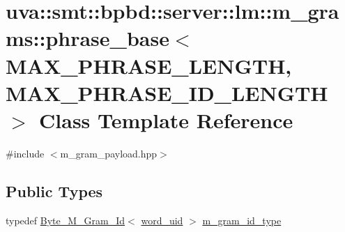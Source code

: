 \hypertarget{classuva_1_1smt_1_1bpbd_1_1server_1_1lm_1_1m__grams_1_1phrase__base}{}\section{uva\+:\+:smt\+:\+:bpbd\+:\+:server\+:\+:lm\+:\+:m\+\_\+grams\+:\+:phrase\+\_\+base$<$ M\+A\+X\+\_\+\+P\+H\+R\+A\+S\+E\+\_\+\+L\+E\+N\+G\+T\+H, M\+A\+X\+\_\+\+P\+H\+R\+A\+S\+E\+\_\+\+I\+D\+\_\+\+L\+E\+N\+G\+T\+H $>$ Class Template Reference}
\label{classuva_1_1smt_1_1bpbd_1_1server_1_1lm_1_1m__grams_1_1phrase__base}


{\ttfamily \#include $<$m\+\_\+gram\+\_\+payload.\+hpp$>$}

\subsection*{Public Types}
\begin{DoxyCompactItemize}
\item 
typedef \hyperlink{classuva_1_1smt_1_1bpbd_1_1server_1_1lm_1_1m__grams_1_1m__gram__id_1_1_byte___m___gram___id}{Byte\+\_\+\+M\+\_\+\+Gram\+\_\+\+Id}$<$ \hyperlink{namespaceuva_1_1smt_1_1bpbd_1_1server_a6bfe45ba344d65a7fdd7d26156328ddc}{word\+\_\+uid} $>$ \hyperlink{classuva_1_1smt_1_1bpbd_1_1server_1_1lm_1_1m__grams_1_1phrase__base_a719fe3b2c7cc694329fa19e510dc0ced}{m\+\_\+gram\+\_\+id\+\_\+type}
\end{DoxyCompactItemize}
